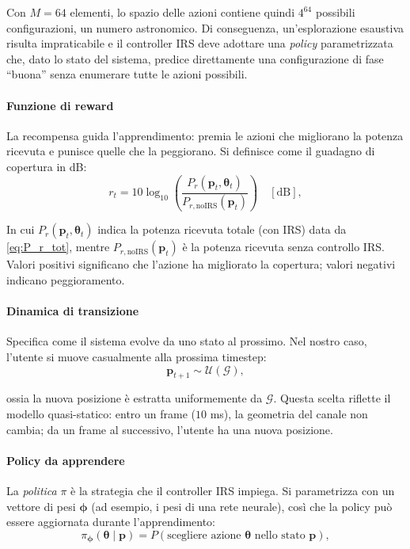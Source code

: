 \documentclass[12pt,a4paper]{report}
\begin{document}
Con $M = 64$ elementi, lo spazio delle azioni contiene quindi
$4^{64}$ possibili configurazioni, un numero astronomico.   Di
conseguenza, un'esplorazione esaustiva risulta impraticabile e il
controller IRS deve adottare una \emph{policy} parametrizzata che,
dato lo stato del sistema, predice direttamente una configurazione di
fase “buona” senza enumerare tutte le azioni possibili.

\paragraph{Funzione di reward}
La recompensa guida l'apprendimento: premia le azioni che migliorano
la potenza ricevuta e punisce quelle che la peggiorano. Si definisce
come il guadagno di copertura in dB:
\begin{equation}
  r_t = 10\log_{10} \left( \frac{P_r(\mathbf{p}_t,
  \boldsymbol{\theta}_t)}{P_{r,\mathrm{noIRS}}(\mathbf{p}_t)} \right)
  \quad [\text{dB}],
  \label{eq:reward_RL}
\end{equation}

In cui $P_r(\mathbf{p}_t, \boldsymbol{\theta}_t)$ indica la potenza
ricevuta totale (con IRS) data da \eqref{eq:P_r_tot}, mentre
$P_{r,\mathrm{noIRS}}(\mathbf{p}_t)$ è la potenza ricevuta senza
controllo IRS. Valori positivi significano che l'azione ha migliorato
la copertura; valori negativi indicano peggioramento.

\paragraph{Dinamica di transizione}
Specifica come il sistema evolve da uno stato al prossimo. Nel nostro
caso, l'utente si muove casualmente alla prossima timestep:
\begin{equation}
  \mathbf{p}_{t+1} \sim \mathcal{U}(\mathcal{G}),
\end{equation}

ossia la nuova posizione è estratta uniformemente da $\mathcal{G}$.
Questa scelta riflette il modello quasi-statico: entro un frame ($10$
ms), la geometria del canale non cambia; da un frame al successivo,
l'utente ha una nuova posizione.

\paragraph{Policy da apprendere}
La \emph{politica} $\pi$ è la strategia che il controller IRS
impiega. Si parametrizza con un vettore di pesi $\boldsymbol{\phi}$
(ad esempio, i pesi di una rete neurale), così che la policy può
essere aggiornata durante l'apprendimento:
\begin{equation}
  \pi_{\boldsymbol{\phi}}(\boldsymbol{\theta} \mid \mathbf{p}) =
  P(\text{scegliere azione } \boldsymbol{\theta} \text{ nello stato }
  \mathbf{p}),
\end{equation}
\end{document}

